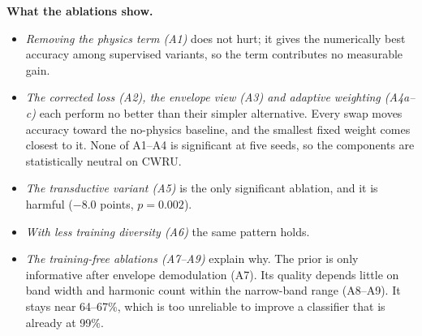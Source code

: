 \documentclass[conference]{IEEEtran}
\begin{document}
\textbf{What the ablations show.}
\begin{itemize}
\item \emph{Removing the physics term (A1)} does not hurt; it gives the
numerically best accuracy among supervised variants, so the term contributes
no measurable gain.
\item \emph{The corrected loss (A2), the envelope view (A3) and adaptive
weighting (A4a--c)} each perform no better than their simpler alternative.
Every swap moves accuracy toward the no-physics baseline, and the smallest
fixed weight comes closest to it. None of A1--A4 is significant at five seeds,
so the components are statistically neutral on CWRU.
\item \emph{The transductive variant (A5)} is the only significant ablation,
and it is harmful ($-8.0$ points, $p=0.002$).
\item \emph{With less training diversity (A6)} the same pattern holds.
\item \emph{The training-free ablations (A7--A9)} explain why. The prior is
only informative after envelope demodulation (A7). Its quality depends little
on band width and harmonic count within the narrow-band range (A8--A9).
It stays near 64--67\%, which is too unreliable to improve a classifier that
is already at 99\%.
\end{itemize}

\end{document}
